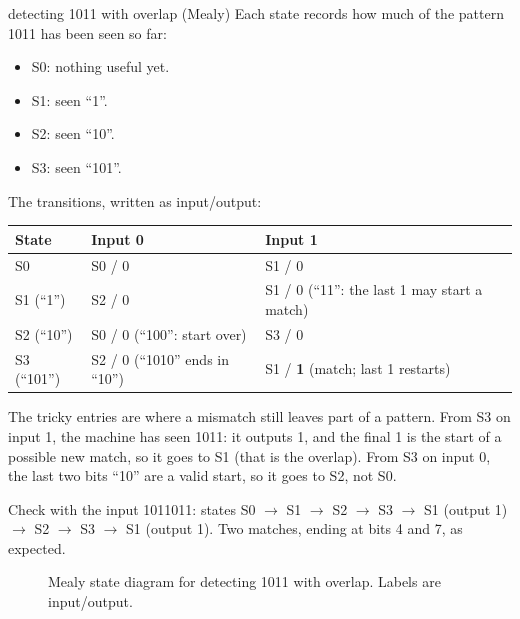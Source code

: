 \begin{worked}{detecting 1011 with overlap (Mealy)}
Each state records how much of the pattern 1011 has been seen so far:
\begin{itemize}
  \item S0: nothing useful yet.
  \item S1: seen ``1''.
  \item S2: seen ``10''.
  \item S3: seen ``101''.
\end{itemize}
The transitions, written as input/output:
\begin{center}
\begin{tabular}{lll}
\toprule
State & Input 0 & Input 1 \\
\midrule
S0 & S0 / 0 & S1 / 0 \\
S1 (``1'') & S2 / 0 & S1 / 0 \quad (``11'': the last 1 may start a match) \\
S2 (``10'') & S0 / 0 \quad (``100'': start over) & S3 / 0 \\
S3 (``101'') & S2 / 0 \quad (``1010'' ends in ``10'') & S1 / \textbf{1} \quad (match; last 1 restarts) \\
\bottomrule
\end{tabular}
\end{center}
The tricky entries are where a mismatch still leaves part of a pattern. From S3 on input 1, the machine has seen 1011: it outputs 1, and the final 1 is the start of a possible new match, so it goes to S1 (that is the overlap). From S3 on input 0, the last two bits ``10'' are a valid start, so it goes to S2, not S0.

Check with the input 1011011: states S0 $\to$ S1 $\to$ S2 $\to$ S3 $\to$ S1 (output 1) $\to$ S2 $\to$ S3 $\to$ S1 (output 1). Two matches, ending at bits 4 and 7, as expected.
\end{worked}

\begin{figure}[h]
\centering
{}
\caption{Mealy state diagram for detecting 1011 with overlap. Labels are input/output.}
\label{fig:seq1011}
\end{figure}

